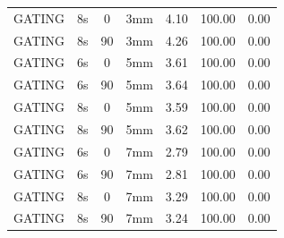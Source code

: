\documentclass[type=dr, dr=rernat, accentcolor=tud7b,colorbacktitle, bigchapter, openright, twoside, 12pt ]{tudthesis}
\begin{document}
\begin{table}[H]
\begin{tabular}{|c||c|c|c||c|c|c|}
GATING & 8s & 0 & 3mm & 4.10 & 100.00 & 0.00 \\
GATING & 8s & 90 & 3mm & 4.26 & 100.00 & 0.00 \\
GATING & 6s & 0 & 5mm & 3.61 & 100.00 & 0.00 \\
GATING & 6s & 90 & 5mm & 3.64 & 100.00 & 0.00 \\
GATING & 8s & 0 & 5mm & 3.59 & 100.00 & 0.00 \\
GATING & 8s & 90 & 5mm & 3.62 & 100.00 & 0.00 \\
GATING & 6s & 0 & 7mm & 2.79 & 100.00 & 0.00 \\
GATING & 6s & 90 & 7mm & 2.81 & 100.00 & 0.00 \\
GATING & 8s & 0 & 7mm & 3.29 & 100.00 & 0.00 \\
GATING & 8s & 90 & 7mm & 3.24 & 100.00 & 0.00 \\
    \hline\hline 
  \end{tabular}
\end{table}


\newpage
\end{document}
